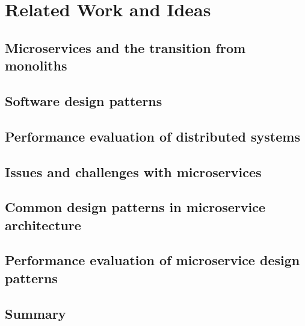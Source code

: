 \chapter{Related Work and Ideas}

\section{Microservices and the transition from monoliths}

\section{Software design patterns}

\section{Performance evaluation of distributed systems}

\section{Issues and challenges with microservices}

\section{Common design patterns in microservice architecture}

\section{Performance evaluation of microservice design patterns}

\section{Summary}
